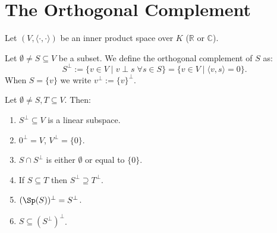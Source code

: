 \renewcommand{\thetheorem}{22.b.\arabic{theorem}}
\setcounter{theorem}{0}

\section{The Orthogonal Complement}

Let $(V, \langle \cdot, \cdot \rangle)$ be an inner product space over $K$ ($\mathbb{R}$ or $\mathbb{C}$).

\begin{definition}
\label{def:orthogonal_complement}
Let $\emptyset \neq S \subseteq V$ be a subset. We define the orthogonal complement of $S$ as:
\[ S^\perp := \{v \in V \mid v \perp s \;\forall s \in S\} = \{v \in V \mid \langle v, s \rangle = 0\}. \]
When $S = \{v\}$ we write $v^\perp := \{v\}^\perp$.
\end{definition}

\begin{lemma}
\label{lem:orthogonal_complement_properties}
Let $\emptyset \neq S, T \subseteq V$. Then:
\begin{enumerate}
    \item $S^\perp \subseteq V$ is a linear subspace.
    \item $0^\perp = V$, $V^\perp = \{0\}$.
    \item $S \cap S^\perp$ is either $\emptyset$ or equal to $\{0\}$.
    \item If $S \subseteq T$ then $S^\perp \supseteq T^\perp$.
    \item $(\Sp(S))^\perp = S^\perp$.
    \item $S \subseteq (S^\perp)^\perp$.
\end{enumerate}
\end{lemma}


